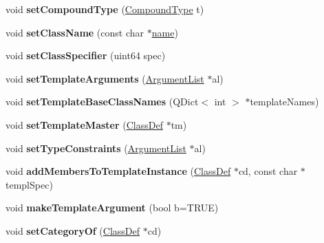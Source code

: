 \begin{DoxyCompactItemize}
void {\bfseries set\+Compound\+Type} (\mbox{\hyperlink{class_class_def_ae70cf86d35fe954a94c566fbcfc87939}{Compound\+Type}} t)
\item 
\mbox{\label{class_class_def_adad7cf7f4706e2cd1b462c215d806d81}} 
void {\bfseries set\+Class\+Name} (const char $\ast$\mbox{\hyperlink{class_definition_a9324000f785d7b6b098878a3bca4df5b}{name}})
\item 
\mbox{\label{class_class_def_a9750b5abacf0f4f36e9d422ab0c2a32e}} 
void {\bfseries set\+Class\+Specifier} (uint64 spec)
\item 
\mbox{\label{class_class_def_ad1904bfd1d375544ae113e5c416bda1b}} 
void {\bfseries set\+Template\+Arguments} (\mbox{\hyperlink{class_argument_list}{Argument\+List}} $\ast$al)
\item 
\mbox{\label{class_class_def_a169b5dd1c61c4febf6c27c809e7f4817}} 
void {\bfseries set\+Template\+Base\+Class\+Names} (Q\+Dict$<$ int $>$ $\ast$template\+Names)
\item 
\mbox{\label{class_class_def_a8abeec8ca715fdf68acefeb38085a9b4}} 
void {\bfseries set\+Template\+Master} (\mbox{\hyperlink{class_class_def}{Class\+Def}} $\ast$tm)
\item 
\mbox{\label{class_class_def_ad590756ae843d8228a1b8b44ba13f8e0}} 
void {\bfseries set\+Type\+Constraints} (\mbox{\hyperlink{class_argument_list}{Argument\+List}} $\ast$al)
\item 
\mbox{\label{class_class_def_a06f99bef9e6f4be508d9e5d9a387ba36}} 
void {\bfseries add\+Members\+To\+Template\+Instance} (\mbox{\hyperlink{class_class_def}{Class\+Def}} $\ast$cd, const char $\ast$templ\+Spec)
\item 
\mbox{\label{class_class_def_a5500484417c1e426604c103497fb55b2}} 
void {\bfseries make\+Template\+Argument} (bool b=T\+R\+UE)
\item 
\mbox{\label{class_class_def_a5d3144a5c93f18c56b301ab28adb12ab}} 
void {\bfseries set\+Category\+Of} (\mbox{\hyperlink{class_class_def}{Class\+Def}} $\ast$cd)
\item 

\end{DoxyCompactItemize}
